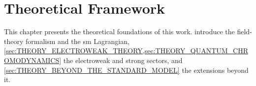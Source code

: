 \documentclass[../../thesis.tex]{subfiles}
\begin{document}
\chapter{Theoretical Framework}
\label{sec:THEORY}

\chaptertitleblock
  {\QuoteChII}
  {\AttribChII}
  {This chapter presents the theoretical foundations of this work.  introduce the field-theory formalism and the \gls{sm} Lagrangian, \cref{sec:THEORY_ELECTROWEAK_THEORY,sec:THEORY_QUANTUM_CHROMODYNAMICS} the electroweak and strong sectors, and \cref{sec:THEORY_BEYOND_THE_STANDARD_MODEL} the extensions beyond it.}

\clearpage






\end{document}
